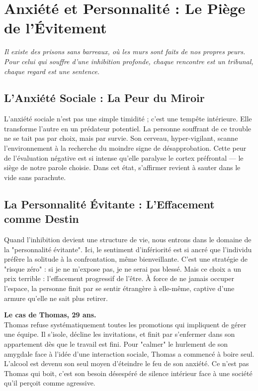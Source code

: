 \chapter{Anxiété et Personnalité : Le Piège de l'Évitement}

\textit{Il existe des prisons sans barreaux, où les murs sont faits de nos propres peurs. Pour celui qui souffre d'une inhibition profonde, chaque rencontre est un tribunal, chaque regard est une sentence.}

\section{L'Anxiété Sociale : La Peur du Miroir}
L'anxiété sociale n'est pas une simple timidité ; c'est une tempête intérieure. Elle transforme l'autre en un prédateur potentiel. La personne souffrant de ce trouble ne se tait pas par choix, mais par survie. Son cerveau, hyper-vigilant, scanne l'environnement à la recherche du moindre signe de désapprobation. Cette peur de l'évaluation négative est si intense qu'elle paralyse le cortex préfrontal — le siège de notre parole choisie. Dans cet état, s'affirmer revient à sauter dans le vide sans parachute.

\section{La Personnalité Évitante : L'Effacement comme Destin}
Quand l'inhibition devient une structure de vie, nous entrons dans le domaine de la "personnalité évitante". Ici, le sentiment d'infériorité est si ancré que l'individu préfère la solitude à la confrontation, même bienveillante. C'est une stratégie de "risque zéro" : si je ne m'expose pas, je ne serai pas blessé. Mais ce choix a un prix terrible : l'effacement progressif de l'être. À force de ne jamais occuper l'espace, la personne finit par se sentir étrangère à elle-même, captive d'une armure qu'elle ne sait plus retirer.

\begin{NoteClinique}
\textbf{Le cas de Thomas, 29 ans.} \\
Thomas refuse systématiquement toutes les promotions qui impliquent de gérer une équipe. Il s'isole, décline les invitations, et finit par s'enfermer dans son appartement dès que le travail est fini. Pour "calmer" le hurlement de son amygdale face à l'idée d'une interaction sociale, Thomas a commencé à boire seul. L'alcool est devenu son seul moyen d'éteindre le feu de son anxiété. Ce n'est pas Thomas qui boit, c'est son besoin désespéré de silence intérieur face à une société qu'il perçoit comme agressive.
\end{NoteClinique}

